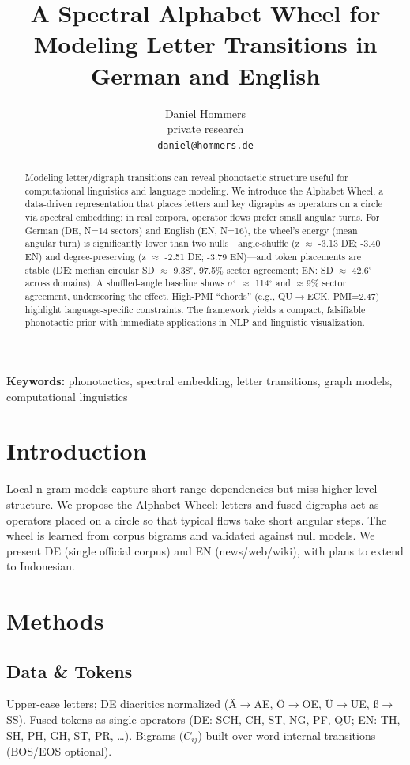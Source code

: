 \documentclass[10pt]{article}
\title{A Spectral Alphabet Wheel for Modeling Letter Transitions in German and English}
\author{Daniel Hommers \\
        private research \\
        \texttt{daniel@hommers.de}}
\date{} %
\begin{document}
\maketitle

\begin{abstract}
Modeling letter/digraph transitions can reveal phonotactic structure useful for computational linguistics and language modeling. We introduce the Alphabet Wheel, a data-driven representation that places letters and key digraphs as operators on a circle via spectral embedding; in real corpora, operator flows prefer small angular turns. For German (DE, N=14 sectors) and English (EN, N=16), the wheel’s energy (mean angular turn) is significantly lower than two nulls—angle-shuffle (z $\approx$ -3.13 DE; -3.40 EN) and degree-preserving (z $\approx$ -2.51 DE; -3.79 EN)—and token placements are stable (DE: median circular SD $\approx$ 9.38$^\circ$, 97.5\% sector agreement; EN: SD $\approx$ 42.6$^\circ$ across domains). A shuffled-angle baseline shows $\sigma^\circ$ $\approx$ 114$^\circ$ and $\approx$9\% sector agreement, underscoring the effect. High-PMI ``chords'' (e.g., QU$\to$ECK, PMI=2.47) highlight language-specific constraints. The framework yields a compact, falsifiable phonotactic prior with immediate applications in NLP and linguistic visualization.
\end{abstract}

\textbf{Keywords:} phonotactics, spectral embedding, letter transitions, graph models, computational linguistics

\section{Introduction}
Local n-gram models capture short-range dependencies but miss higher-level structure. We propose the Alphabet Wheel: letters and fused digraphs act as operators placed on a circle so that typical flows take short angular steps. The wheel is learned from corpus bigrams and validated against null models. We present DE (single official corpus) and EN (news/web/wiki), with plans to extend to Indonesian.

\section{Methods}
\subsection{Data \& Tokens}
Upper-case letters; DE diacritics normalized (Ä$\to$AE, Ö$\to$OE, Ü$\to$UE, ß$\to$SS). Fused tokens as single operators (DE: SCH, CH, ST, NG, PF, QU; EN: TH, SH, PH, GH, ST, PR, \ldots). Bigrams ($C_{ij}$) built over word-internal transitions (BOS/EOS optional).
\end{document}

